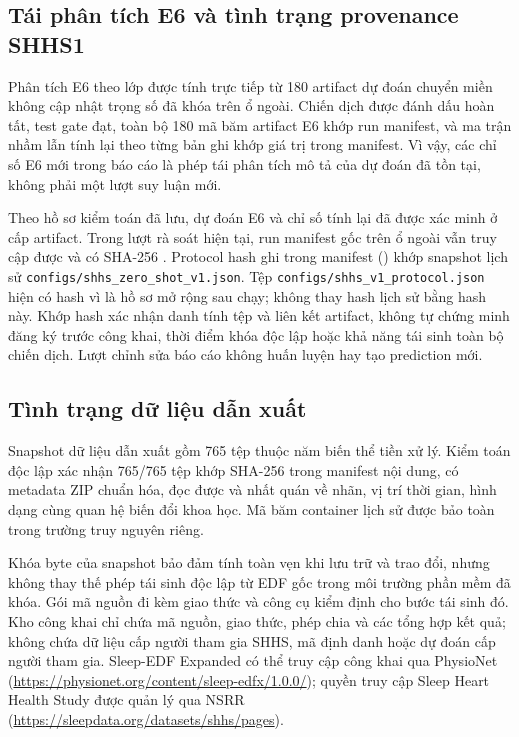 \subsection{Tái phân tích E6 và tình trạng provenance SHHS1}

Phân tích E6 theo lớp được tính trực tiếp từ 180 artifact dự đoán chuyển miền không cập nhật trọng số đã khóa trên ổ ngoài. Chiến dịch được đánh dấu hoàn tất, test gate đạt, toàn bộ 180 mã băm artifact E6 khớp run manifest, và ma trận nhầm lẫn tính lại theo từng bản ghi khớp giá trị trong manifest. Vì vậy, các chỉ số E6 mới trong báo cáo là phép tái phân tích mô tả của dự đoán đã tồn tại, không phải một lượt suy luận mới.

Theo hồ sơ kiểm toán đã lưu, dự đoán E6 và chỉ số tính lại đã được xác minh ở cấp artifact. Trong lượt rà soát hiện tại, run manifest gốc trên ổ ngoài vẫn truy cập được và có SHA-256 . Protocol hash ghi trong manifest () khớp snapshot lịch sử \texttt{configs/shhs\_zero\_shot\_v1.json}. Tệp \texttt{configs/shhs\_v1\_protocol.json} hiện có hash  vì là hồ sơ mở rộng sau chạy; không thay hash lịch sử bằng hash này. Khớp hash xác nhận danh tính tệp và liên kết artifact, không tự chứng minh đăng ký trước công khai, thời điểm khóa độc lập hoặc khả năng tái sinh toàn bộ chiến dịch. Lượt chỉnh sửa báo cáo không huấn luyện hay tạo prediction mới.

\subsection{Tình trạng dữ liệu dẫn xuất}

Snapshot dữ liệu dẫn xuất gồm 765 tệp thuộc năm biến thể tiền xử lý. Kiểm toán độc lập xác nhận 765/765 tệp khớp SHA-256 trong manifest nội dung, có metadata ZIP chuẩn hóa, đọc được và nhất quán về nhãn, vị trí thời gian, hình dạng cùng quan hệ biến đổi khoa học. Mã băm container lịch sử được bảo toàn trong trường truy nguyên riêng.

Khóa byte của snapshot bảo đảm tính toàn vẹn khi lưu trữ và trao đổi, nhưng không thay thế phép tái sinh độc lập từ EDF gốc trong môi trường phần mềm đã khóa. Gói mã nguồn đi kèm giao thức và công cụ kiểm định cho bước tái sinh đó. Kho công khai chỉ chứa mã nguồn, giao thức, phép chia và các tổng hợp kết quả; không chứa dữ liệu cấp người tham gia SHHS, mã định danh hoặc dự đoán cấp người tham gia. Sleep-EDF Expanded có thể truy cập công khai qua PhysioNet (\url{https://physionet.org/content/sleep-edfx/1.0.0/}); quyền truy cập Sleep Heart Health Study được quản lý qua NSRR (\url{https://sleepdata.org/datasets/shhs/pages}).


